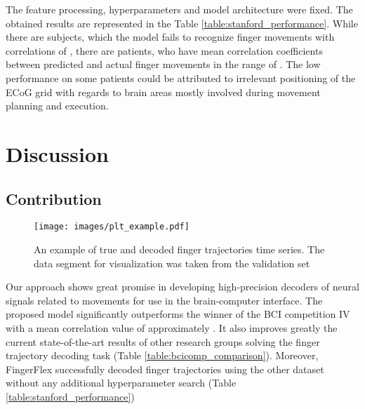 \documentclass[letterpaper]{article} \usepackage{aaai22}  \usepackage{times}  \usepackage{helvet}  \usepackage{courier}  \usepackage[hyphens]{url}  \usepackage{graphicx} \urlstyle{rm} \def\UrlFont{\rm}  \usepackage{natbib}  \usepackage{caption} \DeclareCaptionStyle{ruled}{labelfont=normalfont,labelsep=colon,strut=off} \frenchspacing  \setlength{\pdfpagewidth}{8.5in}  \setlength{\pdfpageheight}{11in}  \usepackage{algorithm}
\begin{document}
The feature processing, hyperparameters and model architecture were fixed. The obtained results are represented in the Table \ref{table:stanford_performance}. While there are subjects, which the model fails to recognize finger movements with correlations of , there are patients, who have mean correlation coefficients between predicted and actual finger movements in the range of . The low performance on some patients could be attributed to irrelevant positioning of the ECoG grid with regards to brain areas mostly involved during movement planning and execution.
















\section{Discussion}

\subsection{Contribution}


\begin{figure*}[h]
    \centering    \texttt{[image: images/plt\_example.pdf]}
    \caption{An example of true and decoded finger trajectories time series. The data segment for visualization was taken from the validation set}
    \label{fig:time series}
\end{figure*}




Our approach shows great promise in developing high-precision decoders of neural signals related to movements for use in the brain-computer interface. The proposed model significantly outperforms the winner of the BCI competition IV with a mean correlation value of approximately . It also improves greatly the current state-of-the-art results of other research groups solving the finger trajectory decoding task (Table \ref{table:bcicomp_comparison}). Moreover, FingerFlex successfully decoded finger trajectories using the other dataset without any additional hyperparameter search (Table \ref{table:stanford_performance})
\end{document}

